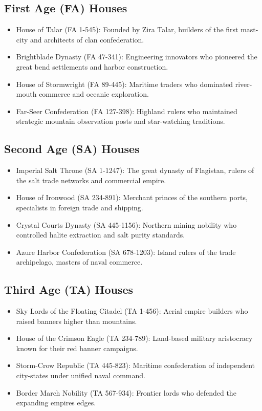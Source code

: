 \subsection{First Age (FA) Houses}\label{first-age-fa-houses}

\begin{itemize}
\tightlist
\item
  House of Talar (FA 1-545): Founded by Zira Talar, builders of the
  first mast-city and architects of clan confederation.
\item
  Brightblade Dynasty (FA 47-341): Engineering innovators who pioneered
  the great bend settlements and harbor construction.
\item
  House of Stormwright (FA 89-445): Maritime traders who dominated
  river-mouth commerce and oceanic exploration.
\item
  Far-Seer Confederation (FA 127-398): Highland rulers who maintained
  strategic mountain observation posts and star-watching traditions.
\end{itemize}

\subsection{Second Age (SA) Houses}\label{second-age-sa-houses}

\begin{itemize}
\tightlist
\item
  Imperial Salt Throne (SA 1-1247): The great dynasty of Flagistan,
  rulers of the salt trade networks and commercial empire.
\item
  House of Ironwood (SA 234-891): Merchant princes of the southern
  ports, specialists in foreign trade and shipping.
\item
  Crystal Courts Dynasty (SA 445-1156): Northern mining nobility who
  controlled halite extraction and salt purity standards.
\item
  Azure Harbor Confederation (SA 678-1203): Island rulers of the trade
  archipelago, masters of naval commerce.
\end{itemize}

\subsection{Third Age (TA) Houses}\label{third-age-ta-houses}

\begin{itemize}
\tightlist
\item
  Sky Lords of the Floating Citadel (TA 1-456): Aerial empire builders
  who raised banners higher than mountains.
\item
  House of the Crimson Eagle (TA 234-789): Land-based military
  aristocracy known for their red banner campaigns.
\item
  Storm-Crow Republic (TA 445-823): Maritime confederation of
  independent city-states under unified naval command.
\item
  Border March Nobility (TA 567-934): Frontier lords who defended the
  expanding empire\textquotesingle s edges.
\end{itemize}

